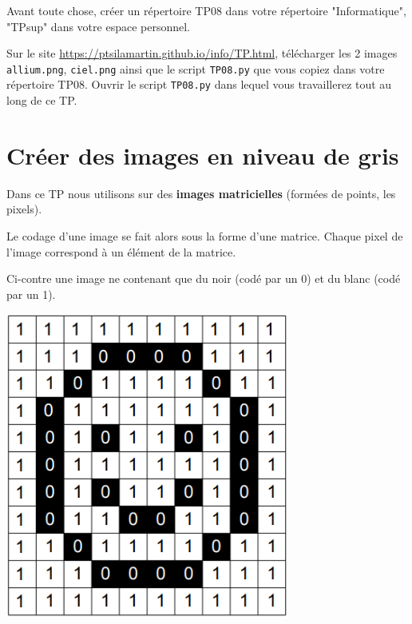 \documentclass[t,11pt,eleve]{article}
\newcounter{cexo}
\begin{document}
\entetetpinfo

Avant toute chose, créer un répertoire TP08 dans votre répertoire "Informatique", "TPsup" dans votre espace personnel.

Sur le site \url{https://ptsilamartin.github.io/info/TP.html}, télécharger les 2  images \texttt{allium.png}, \texttt{ciel.png} ainsi que le script \texttt{TP08.py} que vous copiez dans votre répertoire TP08. Ouvrir le script \texttt{TP08.py} dans lequel vous travaillerez tout au long de ce TP.

\section{Créer des images en niveau de gris}
\begin{minipage}{.7\textwidth}%
Dans ce TP nous utilisons sur des \textbf{images matricielles} (formées de points, les pixels). 

Le codage d'une image se fait alors sous la forme d'une matrice. Chaque pixel de l'image correspond à un élément de la matrice.

Ci-contre une image ne contenant que du noir (codé par un 0) et du blanc (codé par un 1).
\end{minipage}
\hspace{1cm}
\begin{minipage}{.3\textwidth}%
\includegraphics[width=0.7\textwidth]{codage1.png}
\end{minipage}

\vspace{0.3cm}
\end{document}
